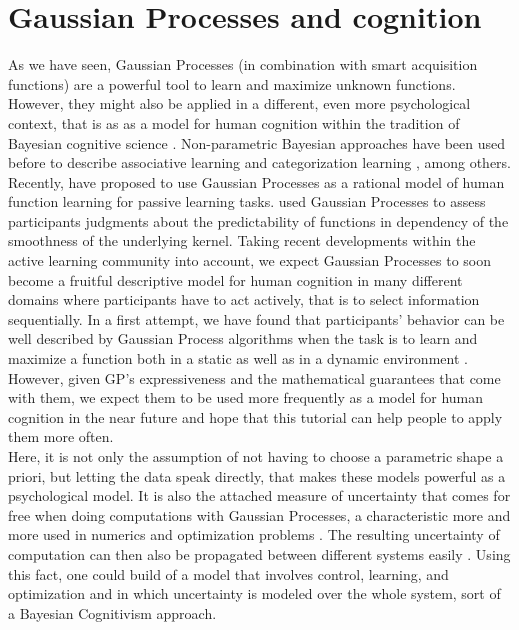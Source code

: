 \documentclass[authoryear,11pt,review]{elsarticle}
\begin{document}
\section{Gaussian Processes and cognition}
As we have seen, Gaussian Processes (in combination with smart acquisition functions) are a powerful tool to learn and maximize unknown functions. However, they might also be applied in a different, even more psychological context, that is as as a model for human cognition within the tradition of Bayesian cognitive science \citep{chater2008probabilistic}. Non-parametric Bayesian approaches have been used before to describe associative learning \citep{gershman2012exploring} and categorization learning \citep{kemp2006learning}, among others.  Recently, \cite{lucas2015rational} have proposed to use Gaussian Processes as a rational model of human function learning for passive learning tasks. \cite{schulzassessing} used Gaussian Processes to assess participants judgments about the predictability of functions in dependency of the smoothness of the underlying kernel. Taking recent developments within the active learning community into account, we expect Gaussian Processes to soon become a fruitful descriptive model for human cognition in many different domains where participants have to act actively, that is to select information sequentially. In a first attempt, we have found that participants' behavior can be well described by Gaussian Process algorithms when the task is to learn and maximize a function both in a static \citep{schulz2015exploration} as well as in a dynamic environment \citep{schulz2015learning}. However, given GP's expressiveness and the mathematical guarantees that come with them, we expect them to be used more frequently as a model for human cognition in the near future and hope that this tutorial can help people to apply them more often.\\

Here, it is not only the assumption of not having to choose a parametric shape a priori, but letting the data speak directly, that makes these models powerful as a psychological model. It is also the attached measure of uncertainty that comes for free when doing computations with Gaussian Processes, a characteristic more and more used in numerics \citep{hennig2015probabilistic} and optimization problems \citep{hennig2013quasi}. The resulting uncertainty of computation can then also be propagated between different systems easily \citep{damianou2012deep}. Using this fact, one could build of a model that involves control, learning, and optimization and in which uncertainty is modeled over the whole system, sort of a Bayesian Cognitivism approach.
\end{document}
